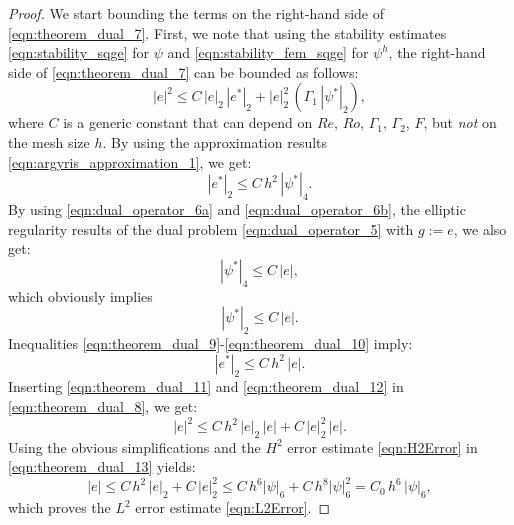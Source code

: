 \begin{proof}
  We start bounding the terms on the right-hand side of
  \eqref{eqn:theorem_dual_7}.  First, we note that using the stability estimates
  \eqref{eqn:stability_sqge} for $\psi$ and \eqref{eqn:stability_fem_sqge} for
  $\psi^h$, the right-hand side of \eqref{eqn:theorem_dual_7} can be bounded as
  follows:
  \begin{equation}
    |e|^2 \leq C \, | e |_2 \, |e^* |_2 + | e |_2^2 \,
      \left( \Gamma_1 \, | \psi^* |_2 \right) ,
    \label{eqn:theorem_dual_8}
  \end{equation}
  where $C$ is a generic constant that can depend on $Re$, $Ro$, $\Gamma_1$,
  $\Gamma_2$, $F$, but \emph{not} on the mesh size $h$.  By using the
  approximation results \eqref{eqn:argyris_approximation_1}, we get:
  \begin{equation}
    |e^* |_2 \leq C \, h^2 \, | \psi^* |_4 .
    \label{eqn:theorem_dual_9}
  \end{equation}
  By using \eqref{eqn:dual_operator_6a} and \eqref{eqn:dual_operator_6b}, the
  elliptic regularity results of the dual problem \eqref{eqn:dual_operator_5}
  with $g := e$, we also get:
  \begin{equation}
    | \psi^* |_4 \leq C \, | e | ,
    \label{eqn:theorem_dual_10}
  \end{equation}
  which obviously implies
  \begin{equation}
    | \psi^* |_2 \leq C \, | e | .
    \label{eqn:theorem_dual_11}
  \end{equation}
  Inequalities \eqref{eqn:theorem_dual_9}-\eqref{eqn:theorem_dual_10} imply:
  \begin{equation}
    |e^* |_2 \leq C \, h^2 \, | e | .
    \label{eqn:theorem_dual_12}
  \end{equation}
  Inserting \eqref{eqn:theorem_dual_11} and \eqref{eqn:theorem_dual_12}  in
  \eqref{eqn:theorem_dual_8}, we get:
  \begin{equation}
    |e|^2 \leq C \, h^2 \, | e |_2 \, | e | + C \, | e |_2^2 \, | e | .
    \label{eqn:theorem_dual_13}
  \end{equation}
  Using the obvious simplifications and the $H^2$ error estimate
  \eqref{eqn:H2Error} in \eqref{eqn:theorem_dual_13} yields:
  \begin{equation}
    |e| \leq C \, h^2 \, | e |_2 + C \, | e |_2^2 \leq C \, h^6 |\psi|_6 + C \,
      h^8 |\psi|_6^2 = C_0 \, h^6\, |\psi|_6 ,
    \label{eqn:theorem_dual_14}
  \end{equation}
  which proves the $L^2$ error estimate \eqref{eqn:L2Error}.


\end{proof}

